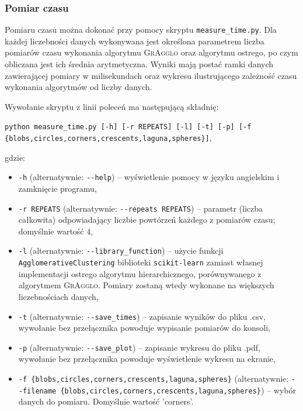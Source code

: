 \documentclass[a4paper,twoside,12pt]{book}
\newcommand{\procedura}[1]{\textsc{#1}}
\newcommand{\MojAlg}{\procedura{GrAgglo}}
\begin{document}
\begin{appendices}
\subsubsection*{Pomiar czasu}

Pomiaru czasu można dokonać przy pomocy skryptu \lstinline|measure_time.py|. Dla każdej liczebności danych wykonywana jest określona parametrem liczba pomiarów czasu wykonania algorytmu \MojAlg{} oraz algorytmu ostrego, po czym obliczana jest ich średnia arytmetyczna. Wyniki mają postać ramki danych zawierającej pomiary w milisekundach oraz wykresu ilustrującego zależność czasu wykonania algorytmów od liczby danych.

Wywołanie skryptu z linii poleceń ma następującą składnię:

\lstinline|python measure_time.py [-h] [-r REPEATS] [-l] [-t] [-p] [-f {blobs,circles,corners,crescents,laguna,spheres}]|,

\noindent gdzie:

\begin{itemize}
	\item \lstinline|-h| (alternatywnie: \lstinline|--help|) -- wyświetlenie pomocy w języku angielskim i zamknięcie programu,
	\item \lstinline|-r REPEATS| (alternatywnie: \lstinline|--repeats REPEATS|) -- parametr (liczba całkowita) odpowiadający liczbie powtórzeń każdego z pomiarów czasu; domyślnie wartość 4,
	\item \lstinline|-l| (alternatywnie: \lstinline|--library_function|) -- użycie funkcji \texttt{Ag\-glo\-me\-ra\-ti\-ve\-Clu\-s\-te\-ring} biblioteki \texttt{scikit-learn} zamiast własnej implementacji ostrego algorytmu hierarchicznego, porównywanego z algorytmem \MojAlg{}. Pomiary zostaną wtedy wykonane na większych liczebnościach danych,
	\item \lstinline|-t| (alternatywnie: \lstinline|--save_times|) -- zapisanie wyników do pliku .csv, wywołanie bez przełącznika powoduje wypisanie pomiarów do konsoli,
	\item \lstinline|-p| (alternatywnie: \lstinline|--save_plot|) -- zapisanie wykresu do pliku .pdf, wywołanie bez przełącznika powoduje wyświetlenie wykresu na ekranie,
	\item \lstinline|-f {blobs,circles,corners,crescents,laguna,spheres}| (alternatywnie: \lstinline|--filename {blobs,circles,corners,crescents,laguna,spheres}|) -- wybór danych do pomiaru. Domyślnie wartość 'corners'.
\end{itemize}


\end{appendices}
\end{document}
